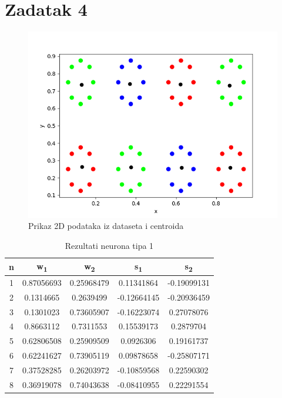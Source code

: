 \documentclass[times, utf8, seminar]{fer}
\begin{document}
\chapter{Zadatak 4}
\begin{figure}[H]
    \centering
    \includegraphics[scale=0.7]{img/zad_4.png}
    \caption[Caption for LOF]{Prikaz 2D podataka iz dataseta i centroida\footnotemark}
    \label{zad4:img}
\end{figure}

\begin{table}[H]
    \centering
    \begin{tabular}{|c c c c c|} 
        \hline
        n & w\textsubscript{1} & w\textsubscript{2} & s\textsubscript{1} & s\textsubscript{2} \\ [0.5ex] 
        \hline\hline
        \rowcolor{Red}
        1 & 0.87056693 & 0.25968479 & 0.11341864 & -0.19099131 \\
        \rowcolor{Red}
        2 & 0.1314665 & 0.2639499 & -0.12664145 & -0.20936459 \\
        \rowcolor{Green}
        3 & 0.1301023 & 0.73605907 & -0.16223074 & 0.27078076 \\
        \rowcolor{Green}
        4 & 0.8663112 & 0.7311553 & 0.15539173 & 0.2879704 \\
        \rowcolor{Blue}
        5 & 0.62806508 & 0.25909509 & 0.0926306 & 0.19161737 \\
        \rowcolor{Red}
        6 & 0.62241627 & 0.73905119 & 0.09878658 & -0.25807171 \\
        \rowcolor{Green}
        7 & 0.37528285 & 0.26203972 & -0.10859568 & 0.22590302 \\
        \rowcolor{Blue}
        8 & 0.36919078 & 0.74043638 & -0.08410955 & 0.22291554 \\ [1ex]
        \hline
    \end{tabular}
    \caption{Rezultati neurona tipa 1}
    \label{zad4:table1}
\end{table}
\end{document}
